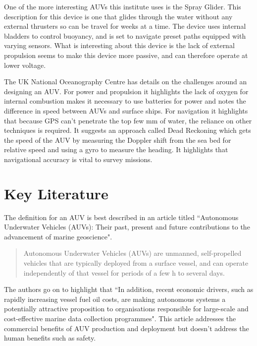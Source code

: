 \documentclass[11pt,a4paper,titlepage]{report}
\begin{document}
	One of the more interesting AUVs this institute uses is the Spray Glider\cite{WOODS_HOLE_SPRAY_GLIDER}. This description for this device is one that glides through the water without any external thrusters so can be travel for weeks at a time. The device uses internal bladders to control buoyancy, and is set to navigate preset paths equipped with varying sensors. What is interesting about this device is the lack of external propulsion seems to make this device more passive, and can therefore operate at lower voltage.
	
	The UK National Oceanography Centre has details on the challenges around an designing an AUV\cite{NATIONAL_OCEANOGRAPHIC_AUTOSUBS}. For power and propulsion it highlights the lack of oxygen for internal combustion makes it necessary to use batteries for power and notes the difference in speed between AUVs and surface ships. For navigation it highlights that because GPS can't penetrate the top few mm of water, the reliance on other techniques is required. It suggests an approach called Dead Reckoning which gets the speed of the AUV by measuring the Doppler shift from the sea bed for relative speed and using a gyro to measure the heading. It highlights that navigational accuracy is vital to survey missions. 
	
	\section*{Key Literature}
	The definition for an AUV is best described in an article titled ``Autonomous Underwater Vehicles (AUVs): Their past, present and future contributions to the advancement of marine geoscience". 
	
	\begin{quote}
		Autonomous Underwater Vehicles (AUVs) are unmanned, self-propelled vehicles that are typically deployed from a surface vessel, and can operate independently of that vessel for periods of a few h to several days.\cite{AUV_PPF}
	\end{quote}
	
	The authors go on to highlight that ``In addition, recent economic drivers, such as rapidly increasing vessel fuel oil costs, are making autonomous systems a potentially attractive proposition to organisations responsible for large-scale and cost-effective marine data collection programmes"\cite{AUV_PPF}. This article addresses the commercial benefits of AUV production and deployment but doesn't address the human benefits such as safety. 
	
\end{document}

